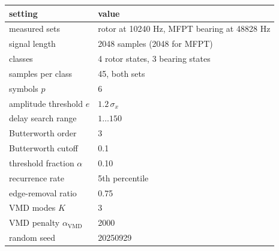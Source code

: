 \begin{tabular}{ll}
\toprule
setting & value \\
\midrule
measured sets & rotor at 10240 Hz, MFPT bearing at 48828 Hz \\
signal length & 2048 samples (2048 for MFPT) \\
classes & 4 rotor states, 3 bearing states \\
samples per class & 45, both sets \\
symbols $p$ & 6 \\
amplitude threshold $e$ & $1.2\,\sigma_x$ \\
delay search range & $1 \ldots 150$ \\
Butterworth order & 3 \\
Butterworth cutoff & 0.1 \\
threshold fraction $\alpha$ & 0.10 \\
recurrence rate & 5th percentile \\
edge-removal ratio & 0.75 \\
VMD modes $K$ & 3 \\
VMD penalty $\alpha_{\mathrm{VMD}}$ & 2000 \\
random seed & 20250929 \\
\bottomrule
\end{tabular}
